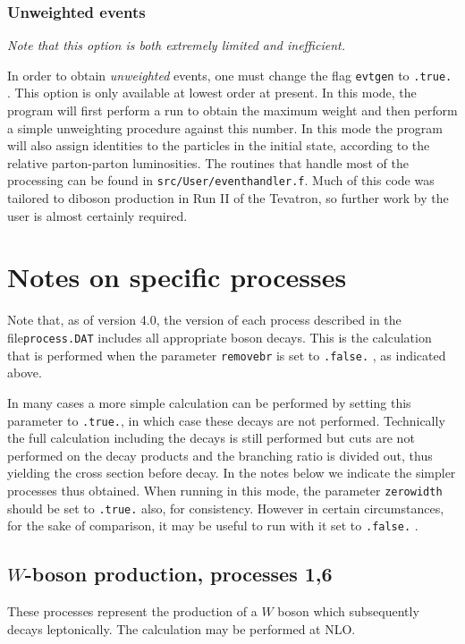 \documentclass[12pt]{article}
\begin{document}
\subsubsection{Unweighted events}
{\it Note that this option is both extremely limited and inefficient.}

In order to obtain {\it unweighted} events, one must change the flag
{\tt evtgen} to {\tt .true.} . This option is only available at lowest order
at present. In this mode, the program will first perform a run to obtain the
maximum weight and then perform a simple unweighting procedure against this
number. In this mode the program will also assign identities to the
particles in the initial state, according to the relative parton-parton
luminosities. The routines that handle most of the processing can be found
in {\tt src/User/eventhandler.f}. Much of this code was tailored to diboson
production in Run II of the Tevatron, so further work by the user is almost
certainly required.

\section{Notes on specific processes}
\label{sec:specific}

Note that, as of version 4.0, the version of each process described in the file{\tt process.DAT} includes all appropriate boson decays. This is the 
calculation
that is performed when the parameter {\tt removebr} is set to {\tt .false.} ,
as indicated above.

In many cases a more simple calculation can be performed by setting this
parameter to {\tt .true.}, in which case these decays are not performed.
Technically the full calculation including the decays
is still performed but cuts are not performed on the decay products and the
branching ratio is divided out, thus yielding the cross section before decay.
In the notes below we indicate the simpler processes thus obtained. When running in
this mode, the parameter {\tt zerowidth} should be set to {\tt .true.} also,
for consistency. However in certain circumstances, for the sake of comparison,
it may be useful to run with it set to {\tt .false.} .

\subsection{$W$-boson production, processes 1,6}
\label{subsec:wboson}

These processes represent the production of a $W$ boson which subsequently
decays leptonically. The calculation may be performed at NLO.
\end{document}
